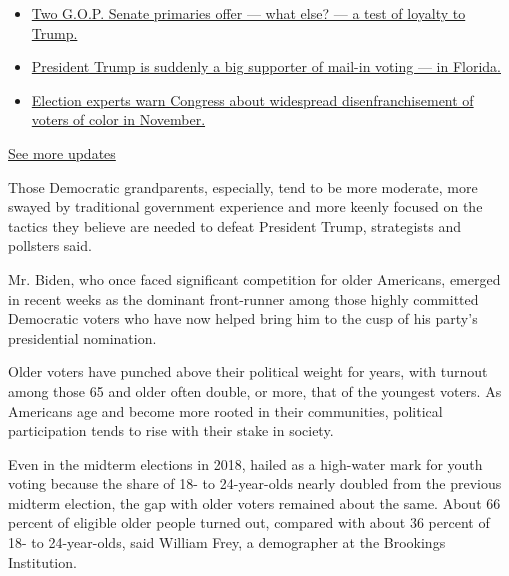 \begin{itemize}
\tightlist
\item
  \href{https://www.nytimes.com/2020/08/04/us/elections/primary-election-michigan-arizona-kansas.html?action=click\&pgtype=Article\&state=default\&region=MAIN_CONTENT_1\&context=storylines_live_updates\#link-3924dd44}{Two
  G.O.P. Senate primaries offer --- what else? --- a test of loyalty to
  Trump.}
\item
  \href{https://www.nytimes.com/2020/08/04/us/elections/primary-election-michigan-arizona-kansas.html?action=click\&pgtype=Article\&state=default\&region=MAIN_CONTENT_1\&context=storylines_live_updates\#link-32b39e33}{President
  Trump is suddenly a big supporter of mail-in voting --- in Florida.}
\item
  \href{https://www.nytimes.com/2020/08/04/us/elections/primary-election-michigan-arizona-kansas.html?action=click\&pgtype=Article\&state=default\&region=MAIN_CONTENT_1\&context=storylines_live_updates\#link-6d019753}{Election
  experts warn Congress about widespread disenfranchisement of voters of
  color in November.}
\end{itemize}

\href{https://www.nytimes.com/2020/08/04/us/elections/primary-election-michigan-arizona-kansas.html?action=click\&pgtype=Article\&state=default\&region=MAIN_CONTENT_1\&context=storylines_live_updates}{See
more updates}

Those Democratic grandparents, especially, tend to be more moderate,
more swayed by traditional government experience and more keenly focused
on the tactics they believe are needed to defeat President Trump,
strategists and pollsters said.

Mr. Biden, who once faced significant competition for older Americans,
emerged in recent weeks as the dominant front-runner among those highly
committed Democratic voters who have now helped bring him to the cusp of
his party's presidential nomination.

Older voters have punched above their political weight for years, with
turnout among those 65 and older often double, or more, that of the
youngest voters. As Americans age and become more rooted in their
communities, political participation tends to rise with their stake in
society.

Even in the midterm elections in 2018, hailed as a high-water mark for
youth voting because the share of 18- to 24-year-olds nearly doubled
from the previous midterm election, the gap with older voters remained
about the same. About 66 percent of eligible older people turned out,
compared with about 36 percent of 18- to 24-year-olds, said William
Frey, a demographer at the Brookings Institution.

